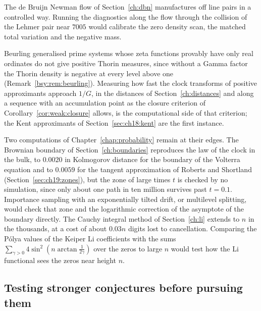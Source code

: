 The de Bruijn Newman flow of Section~\ref{ch:dbn} manufactures off line pairs in a controlled way. Running the diagnostics along the flow through the collision of the Lehmer pair near $7005$ would calibrate the zero density scan, the matched total variation and the negative mass.

Beurling generalised prime systems whose zeta functions provably have only real ordinates do not give positive Thorin measures, since without a Gamma factor the Thorin density is negative at every level above one (Remark~\ref{bsy:rem:beurling}). Measuring how fast the clock transforms of positive approximants approach $1/G$, in the distances of Section~\ref{ch:distances} and along a sequence with an accumulation point as the closure criterion of Corollary~\ref{cor:weak:closure} \cite[Propositions 18.10 and 18.14]{P26} allows, is the computational side of that criterion; the Kent approximants of Section~\ref{sec:ch18:kent} are the first instance.

Two computations of Chapter~\ref{chap:probability} remain at their edges. The Brownian boundary of Section~\ref{ch:boundaries} reproduces the law of the clock in the bulk, to $0.0020$ in Kolmogorov distance for the boundary of the Volterra equation and to $0.0059$ for the tangent approximation of Roberts and Shortland (Section~\ref{sec:ch19:zones}), but the zone of large times $t$ is checked by no simulation, since only about one path in ten million survives past $t=0.1$. Importance sampling with an exponentially tilted drift, or multilevel splitting, would check that zone and the logarithmic correction of the asymptote of the boundary directly. The Cauchy integral method of Section~\ref{ch:li} extends to $n$ in the thousands, at a cost of about $0.03n$ digits lost to cancellation. Comparing the P\'olya values of the Keiper Li coefficients with the sums $\sum_{\gamma>0}4\sin^2(n\arctan\frac1{2\gamma})$ over the zeros to large $n$ would test how the Li functional sees the zeros near height $n$.

\subsection{Testing stronger conjectures before pursuing them}\label{st:sec:wp5}

